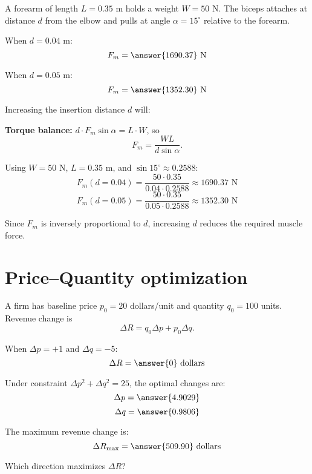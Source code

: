 \documentclass{ximera}
\begin{document}
\begin{problem}
A forearm of length \(L=0.35\) m holds a weight \(W=50\) N. The biceps attaches at distance \(d\) from the elbow and pulls at angle \(\alpha=15^\circ\) relative to the forearm.

When \(d=0.04\) m:
\[
F_m = \answer{1690.37} \text{ N}
\]

When \(d=0.05\) m:
\[
F_m = \answer{1352.30} \text{ N}
\]

Increasing the insertion distance \(d\) will:
\begin{multipleChoice}
\end{multipleChoice}
\end{problem}

\begin{solution}
\textbf{Torque balance:} \(d \cdot F_m \sin\alpha = L \cdot W\), so
\[
F_m = \frac{WL}{d\sin\alpha}.
\]

Using \(W=50\) N, \(L=0.35\) m, and \(\sin 15^\circ \approx 0.2588\):
\[
F_m(d=0.04) = \frac{50 \cdot 0.35}{0.04 \cdot 0.2588} \approx 1690.37 \text{ N}
\]
\[
F_m(d=0.05) = \frac{50 \cdot 0.35}{0.05 \cdot 0.2588} \approx 1352.30 \text{ N}
\]

Since \(F_m\) is inversely proportional to \(d\), increasing \(d\) reduces the required muscle force.
\end{solution}

\section{Price--Quantity optimization}

\begin{problem}
A firm has baseline price \(p_0=20\) dollars/unit and quantity \(q_0=100\) units. Revenue change is
\[
\Delta R = q_0 \Delta p + p_0 \Delta q.
\]

When \(\Delta p = +1\) and \(\Delta q = -5\):
\[
\Delta R = \answer{0} \text{ dollars}
\]

Under constraint \(\Delta p^2 + \Delta q^2 = 25\), the optimal changes are:
\[
\Delta p = \answer{4.9029}
\]
\[
\Delta q = \answer{0.9806}
\]

The maximum revenue change is:
\[
\Delta R_{\max} = \answer{509.90} \text{ dollars}
\]

Which direction maximizes \(\Delta R\)?
\begin{multipleChoice}
\end{multipleChoice}
\end{problem}
\end{document}
